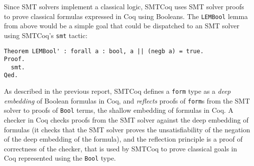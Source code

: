 \documentclass{article}
\begin{document}
	Since SMT solvers implement 
	a classical logic, SMTCoq 
	uses SMT solver proofs to 
	prove classical formulas 
	expressed in Coq using Booleans. The 
	\texttt{LEMBool} lemma from 
	above would be a simple goal that 
	could be dispatched to an SMT 
	solver using SMTCoq's \texttt{smt}
	tactic:
	\begin{verbatim}
Theorem LEMBool' : forall a : bool, a || (negb a) = true.
Proof.
  smt.
Qed.
	\end{verbatim}
	As described in the previous report, 
	SMTCoq defines a \texttt{form} type
	as a \textit{deep embedding} of Boolean 
	formulas in Coq, and \textit{reflects} 
	proofs of \texttt{form}s from the SMT 
	solver to proofs of \texttt{Bool} 
	terms, 
	the shallow embedding of formulas 
	in Coq. A checker in Coq checks 
	proofs from the SMT solver against
	the deep embedding of formulas
	(it checks that the SMT solver proves 
	the unsatisfiability of the negation
	of the deep embedding of the formula), and 
	the reflection principle is a proof
	of correctness of the checker, that 
	is used by SMTCoq to prove classical
	goals in Coq represented using the
	\texttt{Bool} type.
	
	
\end{document}
